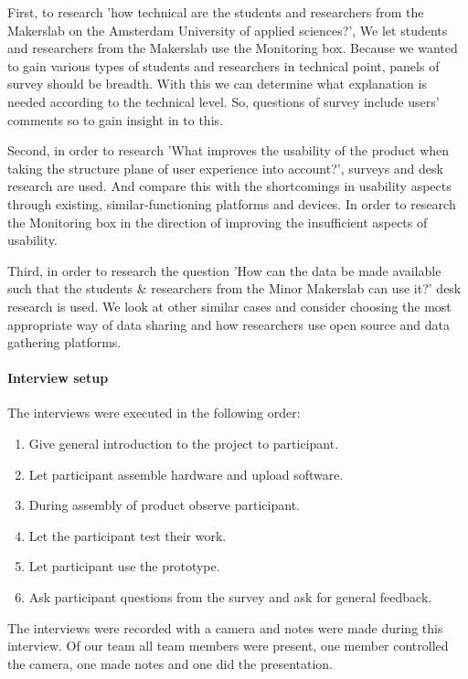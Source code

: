 \documentclass[conference]{IEEEtran}
\begin{document}
		First, to research 'how technical are the students and researchers from the Makerslab on the Amsterdam University of applied sciences?', We let students and researchers from the Makerslab use the Monitoring box. Because we wanted to gain various types of students and researchers in technical point, panels of survey should be breadth. With this we can determine what explanation is needed according to the technical level. So, questions of survey include users' comments so to gain insight in to this. 

		Second, in order to research 'What improves the usability of the product when taking the structure plane of user experience into account?', surveys and desk research are used. And compare this with the shortcomings in usability aspects through existing, similar-functioning platforms and devices. In order to research the Monitoring box in the direction of improving the insufficient aspects of usability.

		Third, in order to research the question 'How can the data be made available such that the students \& researchers from the Minor Makerslab can use it?' desk research is used. We look at other similar cases and consider choosing the most appropriate way of data sharing and how researchers use open source and data gathering platforms.
	\paragraph{Interview setup} The interviews were executed in the following order:
		\begin{enumerate}
			\item Give general introduction to the project to participant.
			\item Let participant assemble hardware and upload software.
			\item During assembly of product observe participant.
			\item Let the participant test their work.
			\item Let participant use the prototype.
			\item Ask participant questions from the survey and ask for general feedback.
		\end{enumerate}
		The interviews were recorded with a camera and notes were made during this interview. Of our team all team members were present, one member controlled the camera, one made notes and one did the presentation.
\end{document}
